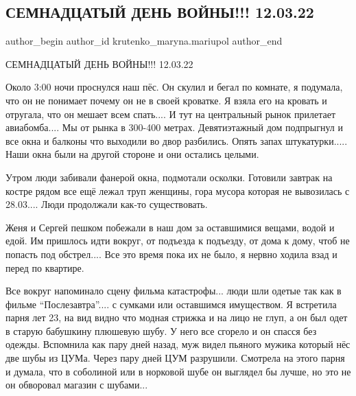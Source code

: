  
 
 
 
 

\subsection{СЕМНАДЦАТЫЙ ДЕНЬ ВОЙНЫ!!! 12.03.22}
\label{sec:12_03_2023.fb.krutenko_maryna.mariupol.1.17_den_12_03}

\ifcmt
 author_begin
   author_id krutenko_maryna.mariupol
 author_end
\fi

СЕМНАДЦАТЫЙ ДЕНЬ ВОЙНЫ!!! 12.03.22

Около 3:00 ночи проснулся наш пёс. Он скулил и бегал по комнате, я подумала,
что он не понимает почему он не в своей кроватке. Я взяла его на кровать и
отругала, что он мешает всем спать.... И тут на центральный рынок прилетает
авиабомба.... Мы от рынка в 300-400 метрах. Девятиэтажный дом подпрыгнул и все
окна и балконы что выходили во двор разбились. Опять запах штукатурки..... Наши
окна были на другой стороне и они остались целыми. 

Утром люди забивали фанерой окна, подмотали осколки. Готовили завтрак на костре
рядом все ещё лежал труп женщины, гора мусора которая не вывозилась с 28.03....
Люди продолжали как-то существовать. 

Женя и Сергей пешком побежали в наш дом за оставшимися вещами, водой и едой. Им
пришлось идти вокруг, от подъезда к подъезду, от дома к дому, чтоб не попасть
под обстрел.... Все это время пока их не было, я нервно ходила взад и перед по
квартире.

Все вокруг напоминало сцену фильма катастрофы... люди шли одетые так как в фильме
\enquote{Послезавтра}.... с сумками или оставшимся имуществом. Я встретила парня лет 23,
на вид видно что модная стрижка и на лицо не глуп, а он был одет в старую
бабушкину плюшевую шубу. У него все сгорело и он спасся без одежды. Вспомнила
как пару дней назад, муж видел пьяного мужика который нёс две шубы из ЦУМа.
Через пару дней ЦУМ разрушили. Смотрела на этого парня и думала, что в
соболиной или в норковой шубе он выглядел бы лучше, но это не он обворовал
магазин с шубами...  

